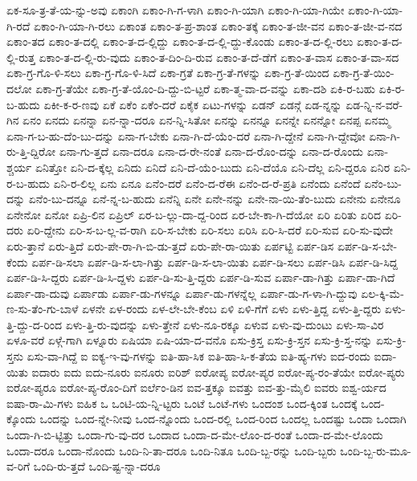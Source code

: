 {ಏಕ-ಸೂ-ತ್ರ-ತೆ-ಯ-ನ್ನು-ಅವು
ಏಕಾಂಗಿ
ಏಕಾಂ-ಗಿ-ಗ-ಳಾಗಿ
ಏಕಾಂ-ಗಿ-ಯಾಗಿ
ಏಕಾಂ-ಗಿ-ಯಾ-ಗಿಯೇ
ಏಕಾಂ-ಗಿ-ಯಾ-ಗಿ-ರದೆ
ಏಕಾಂ-ಗಿ-ಯಾ-ಗಿ-ರಲು
ಏಕಾಂತ
ಏಕಾಂ-ತ-ಪ್ರ-ಶಾಂತ
ಏಕಾಂ-ತಕ್ಕೆ
ಏಕಾಂ-ತ-ಜೀ-ವನ
ಏಕಾಂ-ತ-ಜೀ-ವ-ನದ
ಏಕಾಂ-ತದ
ಏಕಾಂ-ತ-ದಲ್ಲಿ
ಏಕಾಂ-ತ-ದ-ಲ್ಲಿದ್ದು
ಏಕಾಂ-ತ-ದ-ಲ್ಲಿ-ದ್ದು-ಕೊಂಡು
ಏಕಾಂ-ತ-ದ-ಲ್ಲಿ-ರಲು
ಏಕಾಂ-ತ-ದ-ಲ್ಲಿ-ರುತ್ತ
ಏಕಾಂ-ತ-ದ-ಲ್ಲಿ-ರು-ವುದು
ಏಕಾಂ-ತ-ದಿಂ-ದಿ-ರುವ
ಏಕಾಂ-ತ-ದೆ-ಡೆಗೆ
ಏಕಾಂ-ತ-ವಾಸ
ಏಕಾಂ-ತ-ವಾ-ಸದ
ಏಕಾ-ಗ್ರ-ಗೊ-ಳಿ-ಸಲು
ಏಕಾ-ಗ್ರ-ಗೊ-ಳಿ-ಸಿದೆ
ಏಕಾ-ಗ್ರತೆ
ಏಕಾ-ಗ್ರ-ತೆ-ಗಳನ್ನು
ಏಕಾ-ಗ್ರ-ತೆ-ಯಿಂದ
ಏಕಾ-ಗ್ರ-ತೆ-ಯಿಂ-ದಲೋ
ಏಕಾ-ಗ್ರ-ತೆಯೇ
ಏಕಾ-ಗ್ರ-ತೆ-ಯೊಂ-ದಿ-ದ್ದು-ಬಿ-ಟ್ಟರೆ
ಏಕಾ-ತ್ಮ-ವಾ-ದ-ವನ್ನು
ಏಕಾ-ದಶಿ
ಏಕಿ-ರ-ಬಹು
ಏಕಿ-ರ-ಬ-ಹುದು
ಏಕೀ-ಕ-ರ-ಣವು
ಏಕೆ
ಏಕೆಂ
ಏಕೆಂ-ದರೆ
ಏಕೈಕ
ಏಟು-ಗಳನ್ನು
ಏಡನ್
ಏಡನ್ಗೆ
ಏಡ-ನ್ನನ್ನು
ಏಡ-ನ್ನಿ-ನ-ವರೆ-ಗಿನ
ಏನಂ
ಏನದು
ಏನನ್ನಾ
ಏನ-ನ್ನಾ-ದರೂ
ಏನ-ನ್ನಿ-ಸಿತೋ
ಏನನ್ನು
ಏನನ್ನೂ
ಏನನ್ನೇ
ಏನನ್ನೋ
ಏನಪ್ಪ
ಏನಮ್ಮ
ಏನಾ-ಗ-ಬ-ಹು-ದೆಂ-ಬು-ದನ್ನು
ಏನಾ-ಗ-ಬೇಕು
ಏನಾ-ಗಿ-ದೆ-ಯೆಂ-ದರೆ
ಏನಾ-ಗಿ-ದ್ದೇನೆ
ಏನಾ-ಗಿ-ದ್ದೇವೋ
ಏನಾ-ಗಿ-ರು-ತ್ತಿ-ದ್ದಿರೋ
ಏನಾ-ಗು-ತ್ತದೆ
ಏನಾ-ದರೂ
ಏನಾ-ದ-ರೇ-ನಂತೆ
ಏನಾ-ದ-ರೊಂ-ದನ್ನು
ಏನಾ-ದ-ರೊಂದು
ಏನಾ-ಶ್ಚರ್ಯ
ಏನಿತ್ತೋ
ಏನಿ-ದ-ಕ್ಕೆಲ್ಲ
ಏನಿದು
ಏನಿದೆ
ಏನಿ-ದೆ-ಯೆಂ-ಬುದು
ಏನಿ-ದೆಯೊ
ಏನಿ-ದೆಲ್ಲ
ಏನಿ-ದ್ದರೂ
ಏನಿರ
ಏನಿ-ರ-ಬ-ಹುದು
ಏನಿ-ರ-ಲಿಲ್ಲ
ಏನು
ಏನೂ
ಏನೆಂ-ದರೆ
ಏನೆಂ-ದ-ರೆಈ
ಏನೆಂ-ದ-ರೆ-ಪ್ರತಿ
ಏನೆಂದು
ಏನೆಂದೆ
ಏನೆಂ-ಬು-ದನ್ನು
ಏನೆಂ-ಬು-ದನ್ನೂ
ಏನೆ-ನ್ನ-ಬ-ಹುದು
ಏನೆನ್ನಿ
ಏನೇ
ಏನೇ-ನನ್ನು
ಏನೇ-ನಾ-ಯಿ-ತೆಂ-ಬುದು
ಏನೇನು
ಏನೇನೂ
ಏನೇನೋ
ಏನೋ
ಏಪ್ರಿ-ಲಿನ
ಏಪ್ರಿಲ್
ಏರ-ಬ-ಲ್ಲು-ದಾ-ದ್ದ-ರಿಂದ
ಏರ-ಬೇ-ಕಾ-ಗಿ-ದೆಯೋ
ಏರಿ
ಏರಿತು
ಏರಿದ
ಏರಿ-ದರು
ಏರಿ-ದ್ದೇನು
ಏರಿ-ಸ-ಬ-ಲ್ಲ-ವ-ರಾಗಿ
ಏರಿ-ಸ-ಬೇಕು
ಏರಿ-ಸಲು
ಏರಿಸಿ
ಏರಿ-ಸಿ-ದರೆ
ಏರಿ-ಸುವ
ಏರಿ-ಸು-ವುದೇ
ಏರು-ತ್ತಾನೆ
ಏರು-ತ್ತಿದೆ
ಏರು-ಪೇ-ರಾ-ಗಿ-ಬಿ-ಡು-ತ್ತದೆ
ಏರು-ಪೇ-ರಾ-ಯಿತು
ಏರ್ಪಟ್ಟಿ
ಏರ್ಪ-ಡಿಸ
ಏರ್ಪ-ಡಿ-ಸ-ಬೇ-ಕೆಂದು
ಏರ್ಪ-ಡಿ-ಸಲಾ
ಏರ್ಪ-ಡಿ-ಸ-ಲಾ-ಗಿತ್ತು
ಏರ್ಪ-ಡಿ-ಸ-ಲಾ-ಯಿತು
ಏರ್ಪ-ಡಿ-ಸಲು
ಏರ್ಪ-ಡಿಸಿ
ಏರ್ಪ-ಡಿ-ಸಿದ್ದ
ಏರ್ಪ-ಡಿ-ಸಿ-ದ್ದರು
ಏರ್ಪ-ಡಿ-ಸಿ-ದ್ದಳು
ಏರ್ಪ-ಡಿ-ಸು-ತ್ತಿ-ದ್ದರು
ಏರ್ಪ-ಡಿ-ಸುವ
ಏರ್ಪಾ-ಡಾ-ಗಿತ್ತು
ಏರ್ಪಾ-ಡಾ-ಗಿದೆ
ಏರ್ಪಾ-ಡಾ-ದುವು
ಏರ್ಪಾಡು
ಏರ್ಪಾ-ಡು-ಗಳನ್ನೂ
ಏರ್ಪಾ-ಡು-ಗಳನ್ನೆಲ್ಲ
ಏರ್ಪಾ-ಡು-ಗ-ಳಾ-ಗಿ-ದ್ದುವು
ಏಲ-ಕ್ಕಿ-ಮೆ-ಣ-ಸು-ತೆಂ-ಗು-ಬಾಳೆ
ಏಳನೇ
ಏಳ-ರಂದು
ಏಳ-ಲೇ-ಬೇ-ಕೆಂಬ
ಏಳಿ
ಏಳಿ-ಗೆಗೆ
ಏಳು
ಏಳು-ತ್ತಿದ್ದ
ಏಳು-ತ್ತಿ-ದ್ದರು
ಏಳು-ತ್ತಿ-ದ್ದು-ದ-ರಿಂದ
ಏಳು-ತ್ತಿ-ರು-ವುದನ್ನು
ಏಳು-ತ್ತೇನೆ
ಏಳು-ನೂ-ರಕ್ಕೂ
ಏಳುವ
ಏಳು-ವು-ದುಂಟು
ಏಳು-ಸಾ-ವಿರ
ಏಳೂ-ವರೆ
ಏಳ್ಗೆ-ಗಾಗಿ
ಏಳ್ನೂರು
ಏಷಿಯಾ
ಏಷಿ-ಯಾ-ದ-ವನೊ
ಏಸು-ಕ್ರಿಸ್ತ
ಏಸು-ಕ್ರಿ-ಸ್ತನ
ಏಸು-ಕ್ರಿ-ಸ್ತ-ನನ್ನು
ಏಸು-ಕ್ರಿ-ಸ್ತನು
ಏಸು-ವಾ-ಗಿದ್ದೆ
ಐ
ಐಕ್ಯ-ಇ-ವು-ಗಳನ್ನು
ಐತಿ-ಹಾ-ಸಿಕ
ಐತಿ-ಹಾ-ಸಿ-ಕ-ತೆಯ
ಐತಿ-ಹ್ಯ-ಗಳು
ಐದ-ರಂದು
ಐದಾ-ಯಿತು
ಐದಾರು
ಐದು
ಐದು-ನೂರು
ಐನೂರು
ಐರಿಶ್
ಐರೋಪ್ಯ
ಐರೋ-ಪ್ಯರ
ಐರೋ-ಪ್ಯ-ರಂ-ತೆಯೇ
ಐರೋ-ಪ್ಯರು
ಐರೋ-ಪ್ಯರೂ
ಐರೋ-ಪ್ಯ-ರೊಂ-ದಿಗೆ
ಐರ್ಲೆಂ-ಡಿನ
ಐವ-ತ್ತಕ್ಕೂ
ಐವತ್ತು
ಐವ-ತ್ತು-ಮೈಲಿ
ಐವರು
ಐಶ್ವ-ರ್ಯದ
ಐಷಾ-ರಾ-ಮಿ-ಗಳು
ಐಹಿಕ
ಒ
ಒಂಟಿ-ಯ-ನ್ನಿ-ಟ್ಟರು
ಒಂಟೆ
ಒಂಟೆ-ಗಳು
ಒಂದಂಶ
ಒಂದ-ಕ್ಕಿಂತ
ಒಂದಕ್ಕೆ
ಒಂದ-ಕ್ಕೊಂದು
ಒಂದನ್ನು
ಒಂದ-ನ್ನೇ-ನೀವು
ಒಂದ-ನ್ನೊಂದು
ಒಂದ-ರಲ್ಲಿ
ಒಂದ-ರಿಂದ
ಒಂದಲ್ಲ
ಒಂದಷ್ಟು
ಒಂದಾ
ಒಂದಾಗಿ
ಒಂದಾ-ಗಿ-ಬಿ-ಟ್ಟಿತ್ತು
ಒಂದಾ-ಗು-ವು-ದರ
ಒಂದಾದ
ಒಂದಾ-ದ-ಮೇ-ಲೊಂ-ದ-ರಂತೆ
ಒಂದಾ-ದ-ಮೇ-ಲೊಂದು
ಒಂದಾ-ದರೂ
ಒಂದಾ-ನೊಂದು
ಒಂದಿ-ನಿ-ತಾ-ದರೂ
ಒಂದಿ-ನಿತೂ
ಒಂದಿ-ಬ್ಬ-ರನ್ನು
ಒಂದಿ-ಬ್ಬರು
ಒಂದಿ-ಬ್ಬ-ರು-ಮೂ-ವ-ರಿಗೆ
ಒಂದಿ-ರು-ತ್ತದೆ
ಒಂದಿ-ಷ್ಟ-ನ್ನಾ-ದರೂ
}
